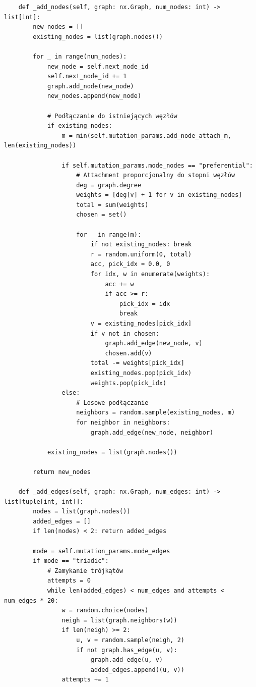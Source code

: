 {\begin{verbatim}
    def _add_nodes(self, graph: nx.Graph, num_nodes: int) -> list[int]:
        new_nodes = []
        existing_nodes = list(graph.nodes())

        for _ in range(num_nodes):
            new_node = self.next_node_id
            self.next_node_id += 1
            graph.add_node(new_node)
            new_nodes.append(new_node)

            # Podłączanie do istniejących węzłów
            if existing_nodes:
                m = min(self.mutation_params.add_node_attach_m, len(existing_nodes))

                if self.mutation_params.mode_nodes == "preferential":
                    # Attachment proporcjonalny do stopni węzłów
                    deg = graph.degree
                    weights = [deg[v] + 1 for v in existing_nodes]
                    total = sum(weights)
                    chosen = set()

                    for _ in range(m):
                        if not existing_nodes: break
                        r = random.uniform(0, total)
                        acc, pick_idx = 0.0, 0
                        for idx, w in enumerate(weights):
                            acc += w
                            if acc >= r:
                                pick_idx = idx
                                break
                        v = existing_nodes[pick_idx]
                        if v not in chosen:
                            graph.add_edge(new_node, v)
                            chosen.add(v)
                        total -= weights[pick_idx]
                        existing_nodes.pop(pick_idx)
                        weights.pop(pick_idx)
                else:
                    # Losowe podłączanie
                    neighbors = random.sample(existing_nodes, m)
                    for neighbor in neighbors:
                        graph.add_edge(new_node, neighbor)

            existing_nodes = list(graph.nodes())

        return new_nodes

    def _add_edges(self, graph: nx.Graph, num_edges: int) -> list[tuple[int, int]]:
        nodes = list(graph.nodes())
        added_edges = []
        if len(nodes) < 2: return added_edges

        mode = self.mutation_params.mode_edges
        if mode == "triadic":
            # Zamykanie trójkątów
            attempts = 0
            while len(added_edges) < num_edges and attempts < num_edges * 20:
                w = random.choice(nodes)
                neigh = list(graph.neighbors(w))
                if len(neigh) >= 2:
                    u, v = random.sample(neigh, 2)
                    if not graph.has_edge(u, v):
                        graph.add_edge(u, v)
                        added_edges.append((u, v))
                attempts += 1


\end{verbatim}}
